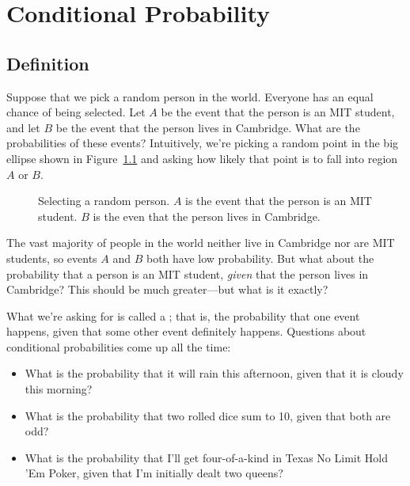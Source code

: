 \chapter{Conditional Probability}\label{chap:cond_prob}

\section{Definition}

Suppose that we pick a random person in the world.  Everyone has an
equal chance of being selected.  Let $A$ be the event that the person
is an MIT student, and let $B$ be the event that the person lives in
Cambridge.  What are the probabilities of these events?  Intuitively,
we're picking a random point in the big ellipse shown in
Figure~\ref{fig:15B1} and asking how likely that point is to fall into
region $A$ or $B$.

\begin{figure}[h]



\caption{Selecting a random person.  $A$ is the event that the person
  is an MIT student.  $B$ is the even that the person lives in
  Cambridge.}

\label{fig:15B1}

\end{figure}

The vast majority of people in the world neither live in Cambridge nor
are MIT students, so events $A$ and $B$ both have low probability.
But what about the probability that a person is an MIT student,
\emph{given} that the person lives in Cambridge?  This should be
much greater---but what is it exactly?

What we're asking for is called a ; that
is, the probability that one event happens, given that some other
event definitely happens.  Questions about conditional probabilities
come up all the time:
%
\begin{itemize}
\item What is the probability that it will rain this afternoon, given
that it is cloudy this morning?
\item What is the probability that two rolled dice sum to 10, given
that both are odd?
\item What is the probability that I'll get four-of-a-kind in Texas No
Limit Hold 'Em Poker, given that I'm initially dealt two queens?
\end{itemize}

